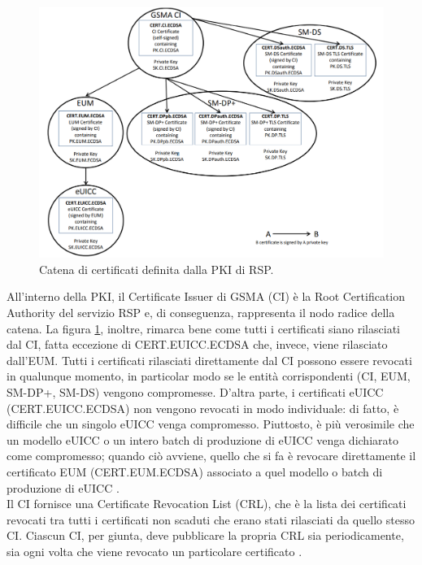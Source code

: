 \documentclass[10pt, twoside, openany]{book}
\begin{document}
\begin{figure}
\includegraphics[width=\linewidth]{cert-chain.png}
\caption{Catena di certificati definita dalla PKI di RSP.}
\label{fig:cert-chain}
\end{figure}
All'interno della PKI, il Certificate Issuer di GSMA (CI) è la Root Certification Authority del servizio RSP e, di conseguenza, rappresenta il nodo radice della catena. La figura \ref{fig:cert-chain}, inoltre, rimarca bene come tutti i certificati siano rilasciati dal CI, fatta eccezione di CERT.EUICC.ECDSA che, invece, viene rilasciato dall'EUM. Tutti i certificati rilasciati direttamente dal CI possono essere revocati in qualunque momento, in particolar modo se le entità corrispondenti (CI, EUM, SM-DP+, SM-DS) vengono compromesse. D'altra parte, i certificati eUICC (CERT.EUICC.ECDSA) non vengono revocati in modo individuale: di fatto, è difficile che un singolo eUICC venga compromesso. Piuttosto, è più verosimile che un modello eUICC o un intero batch di produzione di eUICC venga dichiarato come compromesso; quando ciò avviene, quello che si fa è revocare direttamente il certificato EUM (CERT.EUM.ECDSA) associato a quel modello o batch di produzione di eUICC \cite{GSMA-docs}.\\
Il CI fornisce una Certificate Revocation List (CRL), che è la lista dei certificati revocati tra tutti i certificati non scaduti che erano stati rilasciati da quello stesso CI. Ciascun CI, per giunta, deve pubblicare la propria CRL sia periodicamente, sia ogni volta che viene revocato un particolare certificato \cite{GSMA-docs}.\\
\end{document}
